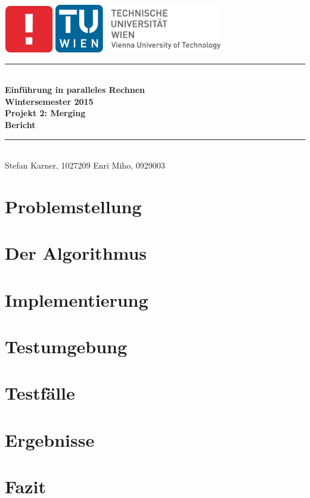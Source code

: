 \documentclass[a4paper,12pt]{article}
\begin{document}
\thispagestyle{empty}
\begin{center}
 \includegraphics[width=0.16\textwidth]{resources/informatik_logo}
\includegraphics[width=0.55\textwidth]{resources/tu_logo}\\[1cm]
\newcommand{\HRule}{\rule{\linewidth}{0.5mm}}
\HRule \\[0.4cm]
{ \Large \bfseries Einführung in paralleles Rechnen\\
Wintersemester 2015\\ [0.2cm]
Projekt 2: Merging \\ [0.2cm]
Bericht}\\[0.4cm]

\HRule \\[1.5cm]
{\large
Stefan Karner, 1027209 \hfill Enri Miho, 0929003
}
\end{center}

\newpage
\tableofcontents
\newpage
\section{Problemstellung}
	

\section{Der Algorithmus}
	

\section{Implementierung}
	

\section{Testumgebung}
	
	
\section{Testfälle}
	
	
\section{Ergebnisse}
	
	
\section{Fazit}
	

\newpage


\end{document}

